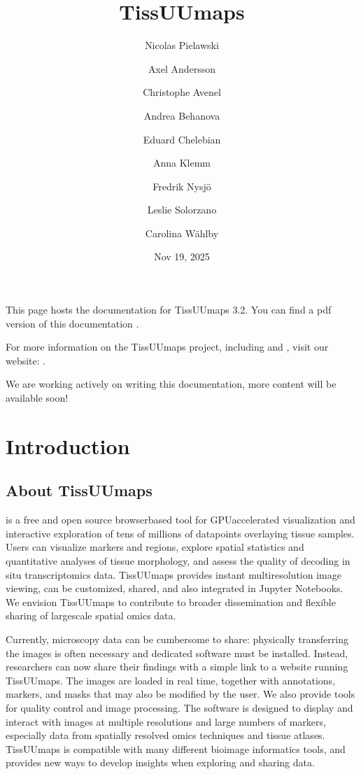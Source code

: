 \documentclass[letterpaper,10pt,english,openany,oneside]{sphinxmanual}
\title{TissUUmaps}
\date{Nov 19, 2025}
\author{Nicolas Pielawski\and Axel Andersson\and Christophe Avenel\and Andrea Behanova\and Eduard Chelebian\and Anna Klemm\and Fredrik Nysjö\and Leslie Solorzano\and Carolina Wählby}
\begin{document}
\pagestyle{empty}
\sphinxmaketitle
\pagestyle{plain}
\sphinxtableofcontents
\pagestyle{normal}
\label{\detokenize{index::doc}}


\sphinxAtStartPar
This page hosts the documentation for TissUUmaps 3.2. You can find a pdf version of this documentation .

\sphinxAtStartPar
For more information on the TissUUmaps project, including  and , visit our website: .

\begin{sphinxShadowBox}

\sphinxAtStartPar
We are working actively on writing this documentation, more content will be available soon!
\end{sphinxShadowBox}

\sphinxstepscope


\chapter{Introduction}
\label{\detokenize{docs/intro/index:introduction}}\label{\detokenize{docs/intro/index::doc}}
\sphinxstepscope


\section{About TissUUmaps}
\label{\detokenize{docs/intro/about:about-tissuumaps}}\label{\detokenize{docs/intro/about::doc}}
\sphinxAtStartPar
{} is a free and open source browser\sphinxhyphen{}based tool for GPU\sphinxhyphen{}accelerated visualization and interactive exploration of tens of millions of datapoints overlaying tissue samples. Users can visualize markers and regions, explore spatial statistics and quantitative analyses of tissue morphology, and assess the quality of decoding in situ transcriptomics data. TissUUmaps provides instant multi\sphinxhyphen{}resolution image viewing, can be customized, shared, and also integrated in Jupyter Notebooks. We envision TissUUmaps to contribute to broader dissemination and flexible sharing of large\sphinxhyphen{}scale spatial omics data.

\sphinxAtStartPar
Currently, microscopy data can be cumbersome to share: physically transferring the images is often necessary and dedicated software must be installed. Instead, researchers can now share their findings with a simple link to a website running TissUUmaps. The images are loaded in real time, together with annotations, markers, and masks that may also be modified by the user. We also provide tools for quality control and image processing. The software is designed to display and interact with images at multiple resolutions and large numbers of markers, especially data from spatially resolved omics techniques and tissue atlases. TissUUmaps is compatible with many different bioimage informatics tools, and provides new ways to develop insights when exploring and sharing data.
\end{document}
